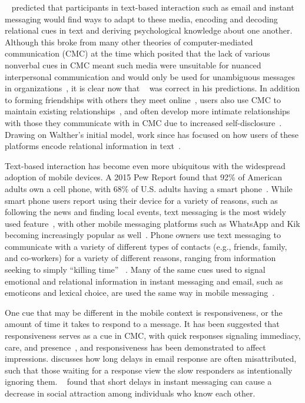 \documentclass[12pt]{nuthesis}	%
\begin{document}
~\citet{walther1992interpersonal} predicted that participants in text-based interaction such as email and instant messaging would find ways to adapt to these media, encoding and decoding relational cues in text and deriving psychological knowledge about one another. Although this broke from many other theories of computer-mediated communication (CMC) at the time which posited that the lack of various nonverbal cues in CMC meant such media were unsuitable for nuanced interpersonal communication and would only be used for unambiguous messages in organizations~\citep[e.g.][]{daft1986organizational,sproull1986reducing}, it is clear now that ~\citeauthor{walther1992interpersonal} was correct in his predictions. In addition to forming friendships with others they meet online~\citep{grinter2006chatting}, users also use CMC to maintain existing relationships~\citep{hu2004friendships}, and often develop more intimate relationships with those they communicate with in CMC due to increased self-disclosure~\citep{valkenburg2009effects}. Drawing on Walther's initial model, work since has focused on how users of these platforms encode relational information in text~\citep[e.g.][]{hancock2007expressing,pirzadeh2014you}.

Text-based interaction has become even more ubiquitous with the widespread adoption of mobile devices. A 2015 Pew Report found that 92\% of American adults own a cell phone, with 68\% of U.S. adults having a smart phone~\citep{anderson2015technology}. While smart phone users report using their device for a variety of reasons, such as following the news and finding local events, text messaging is the most widely used feature~\citep{smith2015us}, with other mobile messaging platforms such as WhatsApp and Kik becoming increasingly popular as well~\citep{duggan2015mobile}. Phone owners use text messaging to communicate with a variety of different types of contacts (e.g., friends, family, and co-workers) for a variety of different reasons, ranging from information seeking to simply ``killing time'' ~\citep{battestini2010large}. Many of the same cues used to signal emotional and relational information in instant messaging and email, such as emoticons and lexical choice, are used the same way in mobile messaging~\citep{lo2008nonverbal,tossell2012longitudinal}.

One cue that may be different in the mobile context is responsiveness, or the amount of time it takes to respond to a message. It has been suggested that responsiveness serves as a cue in CMC, with quick responses signaling immediacy, care, and presence~\citep{kalman2006pauses,walther1995nonverbal}, and responsiveness has been demonstrated to affect impressions. \citet{cramton2002attribution} discusses how long delays in email response are often misattributed, such that those waiting for a response view the slow responders as intentionally ignoring them. ~\citet{heston2017worth} found that short delays in instant messaging can cause a decrease in social attraction among individuals who know each other.
\end{document}
